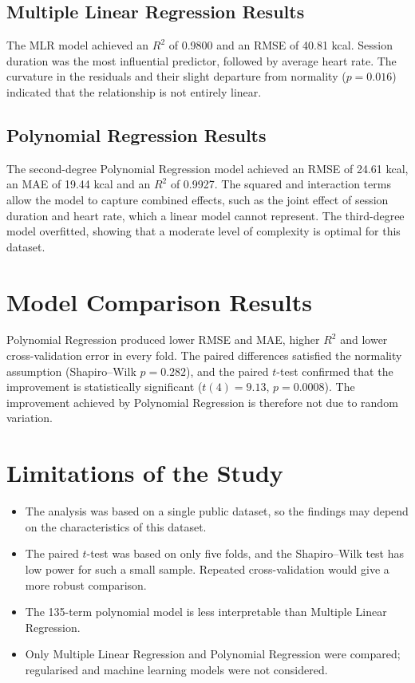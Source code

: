 \documentclass[12pt,a4paper]{report}
\begin{document}
\subsection{Multiple Linear Regression Results}
The MLR model achieved an $R^2$ of 0.9800 and an RMSE of 40.81 kcal. Session duration was the most influential predictor, followed by average heart rate. The curvature in the residuals and their slight departure from normality ($p = 0.016$) indicated that the relationship is not entirely linear.

\subsection{Polynomial Regression Results}
The second-degree Polynomial Regression model achieved an RMSE of 24.61 kcal, an MAE of 19.44 kcal and an $R^2$ of 0.9927. The squared and interaction terms allow the model to capture combined effects, such as the joint effect of session duration and heart rate, which a linear model cannot represent. The third-degree model overfitted, showing that a moderate level of complexity is optimal for this dataset.

\section{Model Comparison Results}
Polynomial Regression produced lower RMSE and MAE, higher $R^2$ and lower cross-validation error in every fold. The paired differences satisfied the normality assumption (Shapiro--Wilk $p = 0.282$), and the paired $t$-test confirmed that the improvement is statistically significant ($t(4) = 9.13$, $p = 0.0008$). The improvement achieved by Polynomial Regression is therefore not due to random variation.

\section{Limitations of the Study}
\begin{itemize}[itemsep=2pt]
\item The analysis was based on a single public dataset, so the findings may depend on the characteristics of this dataset.
\item The paired $t$-test was based on only five folds, and the Shapiro--Wilk test has low power for such a small sample. Repeated cross-validation would give a more robust comparison.
\item The 135-term polynomial model is less interpretable than Multiple Linear Regression.
\item Only Multiple Linear Regression and Polynomial Regression were compared; regularised and machine learning models were not considered.
\end{itemize}
\end{document}
